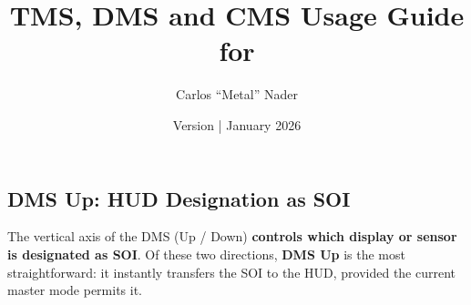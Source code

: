 \documentclass[11pt,a4paper]{article}
\title{TMS, DMS and CMS Usage Guide for \bmsver}
\author{Carlos ``Metal'' Nader}
\date{Version \fulldocversion{0.2.4.0} | January 2026}
\begin{document}
\maketitle

\newpage

\tableofcontents

\newpage




\subsection{DMS Up: HUD Designation as SOI}

\label{sec:C4-S2-S1}


The vertical axis of the DMS (Up / Down) \textbf{controls which display or sensor is designated as SOI}. Of these two directions, \textbf{DMS Up} is the most straightforward: it instantly transfers the SOI to the HUD, provided the current master mode permits it.
\end{document}
